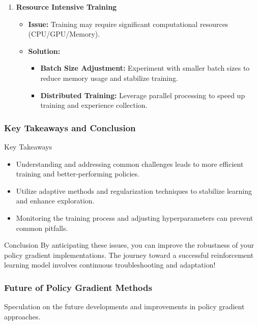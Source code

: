 \documentclass[aspectratio=169]{beamer}
\begin{document}
\begin{frame}[fragile]
\begin{enumerate}
        \item \textbf{Resource Intensive Training}
          \begin{itemize}
            \item \textbf{Issue:} Training may require significant computational resources (CPU/GPU/Memory).
            \item \textbf{Solution:}
              \begin{itemize}
                  \item \textbf{Batch Size Adjustment:} Experiment with smaller batch sizes to reduce memory usage and stabilize training.
                  \item \textbf{Distributed Training:} Leverage parallel processing to speed up training and experience collection.
              \end{itemize}
          \end{itemize}
    \end{enumerate}
\end{frame}

\begin{frame}[fragile]
    \frametitle{Key Takeaways and Conclusion}
    \begin{block}{Key Takeaways}
        \begin{itemize}
            \item Understanding and addressing common challenges leads to more efficient training and better-performing policies.
            \item Utilize adaptive methods and regularization techniques to stabilize learning and enhance exploration.
            \item Monitoring the training process and adjusting hyperparameters can prevent common pitfalls.
        \end{itemize}
    \end{block}

    \begin{block}{Conclusion}
        By anticipating these issues, you can improve the robustness of your policy gradient implementations. The journey toward a successful reinforcement learning model involves continuous troubleshooting and adaptation!
    \end{block}
\end{frame}

\begin{frame}[fragile]
    \frametitle{Future of Policy Gradient Methods}
    Speculation on the future developments and improvements in policy gradient approaches.
\end{frame}
\end{document}
